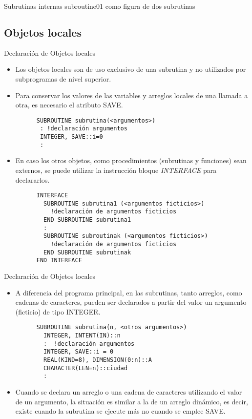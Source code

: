 \begin{frame}[fragile]{Subrutinas internas}
 subroutine01 como figura de dos subrutinas
\end{frame}


\subsection{Objetos locales}

\begin{frame}[fragile]{Declaración de Objetos locales}
 \begin{itemize}[<+(0)->]
  \item Los objetos locales son de uso exclusivo de una subrutina y no utilizados por subprogramas de nivel superior.
  \item Para conservar los valores de las variables y arreglos locales de una llamada a otra, es necesario el atributo SAVE.
   \vspace{0.15cm}
      \begin{verbatim}
      SUBROUTINE subrutina(<argumentos>)
       : !declaración argumentos
       INTEGER, SAVE::i=0
       :
      \end{verbatim}
  \item En caso los otros objetos, como procedimientos (subrutinas y funciones) sean externos, se puede utilizar la instrucción bloque \emph{INTERFACE} para declararlos.
   \vspace{0.15cm}
      \begin{verbatim}
      INTERFACE
        SUBROUTINE subrutina1 (<argumentos ficticios>)
          !declaración de argumentos ficticios
        END SUBROUTINE subrutina1
        :
        SUBROUTINE subroutinak (<argumentos ficticios>)
          !declaración de argumentos ficticios
        END SUBROUTINE subrutinak
      END INTERFACE
      \end{verbatim} 
 \end{itemize}
\end{frame}

\begin{frame}[fragile]{Declaración de Objetos locales}
 \begin{itemize}[<+(0)->]
  \item A diferencia del programa principal, en las subrutinas, tanto arreglos, como cadenas de caracteres, pueden ser declarados a partir del valor un argumento (ficticio) de tipo INTEGER.
   \vspace{0.15cm}
      \begin{verbatim}
      SUBROUTINE subrutina(n, <otros argumentos>)
        INTEGER, INTENT(IN)::n
        :  !declaración argumentos
        INTEGER, SAVE::i = 0
        REAL(KIND=8), DIMENSION(0:n)::A
        CHARACTER(LEN=n)::ciudad
        :
      \end{verbatim}
  \item Cuando se declara un arreglo o una cadena de caracteres utilizando el valor de un argumento, la situación es similar a la de un arreglo dinámico, es decir, existe cuando la subrutina se ejecute más no cuando se emplee SAVE.
 \end{itemize}
\end{frame}


